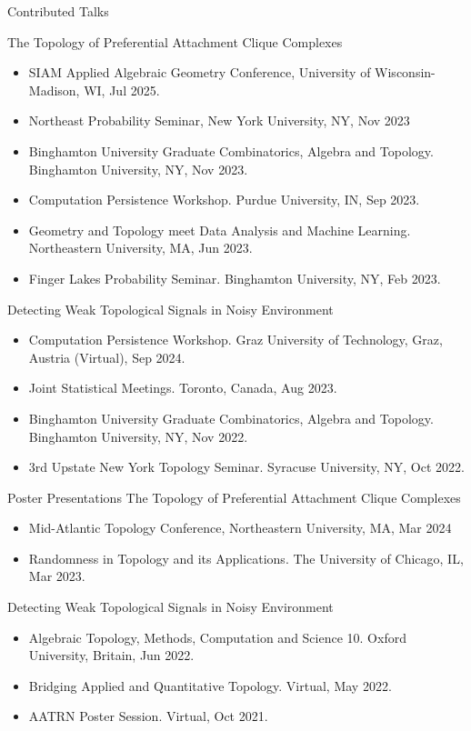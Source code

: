 \documentclass{resume} %
\begin{document}
\begin{rSection}{Contributed Talks}

The Topology of Preferential Attachment Clique Complexes

\begin{itemize}[noitemsep]
    \item SIAM Applied Algebraic Geometry Conference, University of Wisconsin-Madison, WI, Jul 2025.
    \item Northeast Probability Seminar, New York University, NY, Nov 2023
    \item Binghamton University Graduate Combinatorics, Algebra and Topology. Binghamton University, NY, Nov 2023.
    \item Computation Persistence Workshop. Purdue University, IN, Sep 2023.
    \item Geometry and Topology meet Data Analysis and Machine Learning. Northeastern University, MA, Jun 2023.
    \item Finger Lakes Probability Seminar. Binghamton University, NY, Feb 2023.
\end{itemize}

Detecting Weak Topological Signals in Noisy Environment

\begin{itemize}[noitemsep]
    \item Computation Persistence Workshop. Graz University of Technology, Graz, Austria (Virtual), Sep 2024.
    \item Joint Statistical Meetings. Toronto, Canada, Aug 2023.
    \item Binghamton University Graduate Combinatorics, Algebra and Topology. Binghamton University, NY, Nov 2022.
    \item 3rd Upstate New York Topology Seminar. Syracuse University, NY, Oct 2022.
\end{itemize}
\end{rSection}

\newpage

\begin{rSection}{Poster Presentations}
The Topology of Preferential Attachment Clique Complexes
\begin{itemize}[noitemsep]
    \item Mid-Atlantic Topology Conference, Northeastern University, MA, Mar 2024
    \item Randomness in Topology and its Applications. The University of Chicago, IL, Mar 2023.
\end{itemize}

Detecting Weak Topological Signals in Noisy Environment

\begin{itemize}[noitemsep]
    \item Algebraic Topology, Methods, Computation and Science 10. Oxford University, Britain, Jun 2022.
    \item Bridging Applied and Quantitative Topology. Virtual, May 2022.
    \item AATRN Poster Session. Virtual, Oct 2021.
\end{itemize}
\end{rSection}
\end{document}
